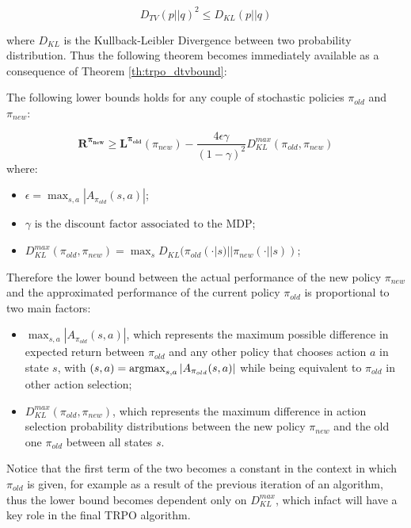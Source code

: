                 \[ D_{TV} (p || q)^2 \leq D_{KL} (p || q)\]
                
                where $D_{KL}$ is the Kullback-Leibler Divergence between two probability distribution. Thus the following theorem becomes immediately available as a consequence of Theorem \ref{th:trpo_dtvbound}:
                
                \begin{theorem}
                    \label{th:trpo_dklbound}
                    The following lower bounds holds for any couple of stochastic policies $\pi_{old}$ and $\pi_{new}$:
                    
                    \[ \mathbf{R^{\pi_{new}}} \geq \mathbf{L^{\pi_{old}}}(\pi_{new}) - \frac{4 \epsilon \gamma}{\left( 1 - \gamma \right)^2} D_{KL}^{max}(\pi_{old}, \pi_{new})\]
                    where:
                    \begin{itemize}
                        \item $\epsilon = \max_{s, a} | A_{\pi_{old}}(s, a) |$;
                        \item $\gamma \text{ is the discount factor associated to the MDP}$;
                        \item $D_{KL}^{max}(\pi_{old}, \pi_{new}) = \max_{s} D_{KL} (\pi_{old}(\cdot | s) || \pi_{new} (\cdot||s))$;
                    \end{itemize}
                \end{theorem}
                \noindent
                Therefore the lower bound between the actual performance of the new policy $\pi_{new}$ and the approximated performance of the current policy $\pi_{old}$ is proportional to two main factors:
                
                \begin{itemize}
                    \item $\max_{s, a} | A_{\pi_{old}}(s, a) |$, which represents the maximum possible difference in expected return between $\pi_{old}$ and any other policy that chooses action $a$ in state $s$, with $(s,a) = \operatorname*{argmax}_{s,a} | A_{\pi_{old}}(s, a) |$ while being equivalent to $\pi_{old}$ in other action selection;
                    \item $D_{KL}^{max}(\pi_{old}, \pi_{new})$, which represents the maximum difference in action selection probability distributions between the new policy $\pi_{new}$ and the old one $\pi_{old}$ between all states $s$.
                \end{itemize}
                \noindent
                Notice that the first term of the two becomes a constant in the context in which $\pi_{old}$ is given, for example as a result of the previous iteration of an algorithm, thus the lower bound becomes dependent only on $D_{KL}^{max}$, which infact will have a key role in the final TRPO algorithm.
                
